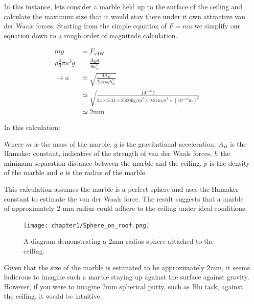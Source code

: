In this instance, lets consider a marble held up to the surface of the ceiling and calculate the maximum size that it would stay there under it own attractive van der Waals forces. Starting from the simple equation of $F = ma$ we simplify our equation down to a rough order of magnitude calculation.


\begin{equation*}
\begin{split}
mg &= F_{\text{vdW}} \\
\rho \frac{4}{3} \pi a^3 g &= \frac{A_H a}{6 h_{m}^2} \\
\rightarrow a &\simeq \sqrt{\frac{3 A_H}{24 \pi \rho g h_{m}^2}} \\
&\simeq \sqrt{\frac{10^{-20} \text{J}}{24 \times 3.14 \times 2500 \text{kg/m}^3 \times 9.81 \text{m/s}^2 \times (10^{-10} \text{m})^2 }} \\
&\simeq 2 \text{mm}
\end{split}
\end{equation*}

In this calculation:

Where $m$ is the mass of the marble, $g$ is the gravitational acceleration, $A_H$ is the Hamaker constant, indicative of the strength of van der Waals forces, $h$ the minimum separation distance between the marble and the ceiling, $p$ is the density of the marble and $a$ is the radius of the marble.

This calculation assumes the marble is a perfect sphere and uses the Hamaker constant to estimate the van der Waals force. The result suggests that a marble of approximately 2 mm radius could adhere to the ceiling under ideal conditions.

\begin{figure}[h]     %
        \begin{center}
          \texttt{[image: chapter1/Sphere\_on\_roof.png]}
\end{center}
\caption{A diagram demonstrating a 2mm radius sphere attached to the ceiling.}
\label{fig:disp}                 %
\end{figure}

Given that the size of the marble is estimated to be approximately 2mm, it seems ludicrous to imagine such a marble staying up against the surface against gravity. However, if you were to imagine 2mm spherical putty, such as Blu tack, against the ceiling, it would be intuitive.

